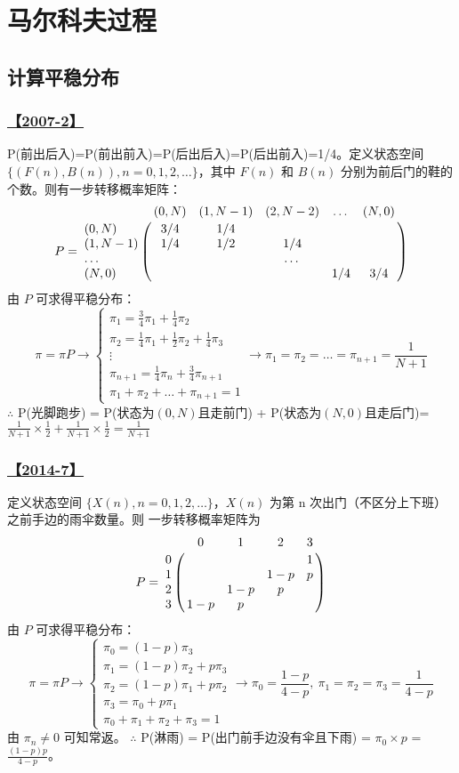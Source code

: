 \setcounter{chapter}{0}
\setcounter{section}{0}
\setcounter{subsection}{0}

\chapter{马尔科夫过程}

\section{计算平稳分布}

\subsection{\hyperref[Q2007-2]{【2007-2】}}\label{A2007-2}

P(前出后入)=P(前出前入)=P(后出后入)=P(后出前入)=1/4。定义状态空间 $\{(F(n), B(n)), n=0, 1, 2, \dots\}$，其中 $F(n)$ 和 $B(n)$ 分别为前后门的鞋的个数。则有一步转移概率矩阵：
$$
P=
\bordermatrix{
~ & (0, N) & (1, N-1) & (2, N-2) & \dots & (N, 0) \cr
(0, N) & 3/4 & 1/4\cr
(1, N-1) & 1/4 & 1/2 & 1/4 \cr
\dots & & & \dots &\cr
(N, 0) & & & & 1/4 & 3/4 \cr
}
$$
由 $P$ 可求得平稳分布：
$$
\pi=\pi P \rightarrow
\begin{cases}
\pi_1 = \frac{3}{4}\pi_1 + \frac{1}{4}\pi_2 \\
\pi_2 = \frac{1}{4}\pi_1 + \frac{1}{2}\pi_2 + \frac{1}{4}\pi_3 \\
\vdots \\
\pi_{n+1} = \frac{1}{4}\pi_{n} + \frac{3}{4}\pi_{n+1} \\
\pi_1+\pi_2+\dots +\pi_{n+1} = 1
\end{cases}
\rightarrow \pi_1=\pi_2=\dots=\pi_{n+1}=\frac{1}{N+1}
$$
$\therefore$ P(光脚跑步) = P(状态为$(0, N)$且走前门) + P(状态为$(N,0)$且走后门)=$\frac{1}{N+1}\times\frac{1}{2} + \frac{1}{N+1}\times\frac{1}{2} = \frac{1}{N+1}$

\subsection{\hyperref[Q2014-7]{【2014-7】}}\label{A2014-7}

定义状态空间 $\{X(n), n=0, 1, 2, \dots\}$，$X(n)$ 为第 n 次出门（不区分上下班）之前手边的雨伞数量。则
一步转移概率矩阵为
$$
P=\bordermatrix{
	~ & 0 & 1 & 2 & 3 \cr
	0 &   &   &   & 1 \cr
	1 &   &   & 1-p & p \cr
	2 &   & 1-p & p & \cr
	3 & 1-p & p \cr
}
$$
由 $P$ 可求得平稳分布：
$$
\pi=\pi P \rightarrow
\begin{cases}
\pi_0 = (1-p)\pi_3 \\
\pi_1 = (1-p)\pi_2 + p\pi_3 \\
\pi_2 = (1-p)\pi_1 + p\pi_2 \\
\pi_3 = \pi_0 + p\pi_1 \\
\pi_0+\pi_1+\pi_2+\pi_3 = 1
\end{cases}
\rightarrow \pi_0=\frac{1-p}{4-p},\ \pi_1=\pi_2=\pi_3=\frac{1}{4-p}
$$
由 $\pi_n\neq0$ 可知常返。
$\therefore$ P(淋雨) = P(出门前手边没有伞且下雨) = $\pi_0\times p$ = $\frac{(1-p)p}{4-p}$。

